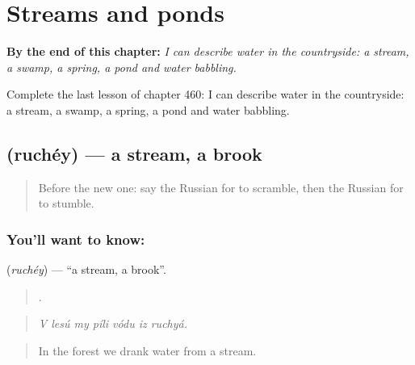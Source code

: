 
\chapter{Streams and ponds}
\label{ch:ru-streams-and-ponds}

\begin{chapteropening}
\textbf{By the end of this chapter:} \emph{I can describe water in the countryside: a stream, a swamp, a spring, a pond and water babbling.}

Complete the last lesson of chapter 460: I can describe water in the countryside: a stream, a swamp, a spring, a pond and water babbling.
\end{chapteropening}

\section[\texorpdfstring{\ru{ручей} (ruchéy)}{ручей (ruchéy)}]{ (ruchéy) — a stream, a brook}

\label{lesson:RU-C460-ruchey}



\begin{quote}
Before the new one: say the Russian for to scramble, then the Russian for to stumble.
\end{quote}

\subsection*{You'll want to know: }
\textbf{} (\emph{ruchéy}) — \textquotedblleft{}a stream, a brook\textquotedblright{}.

\begin{quote}
      .
\end{quote}

\begin{quote}
\emph{V lesú my píli vódu iz ruchyá.}
\end{quote}

\begin{quote}
In the forest we drank water from a stream.
\end{quote}

